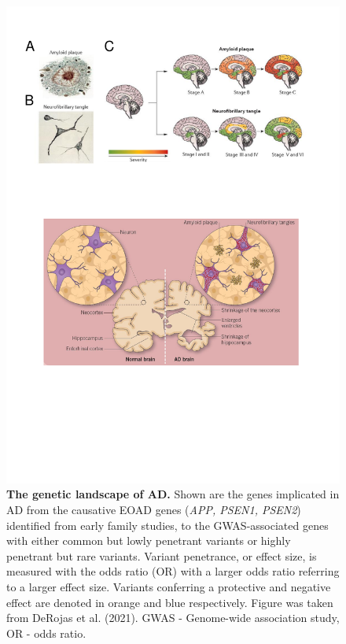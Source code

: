\begin{landscape}
	\begin{figure}[!htp]
		\centering
		\includegraphics[page=11,trim={0 17cm 0cm 1cm},clip, scale = 1.2]{Figures/Introduction_Figures.pdf}
		\captionsetup{width=1.6\textwidth,singlelinecheck=off}
		\caption[The genetic landscape of AD]%
		{\textbf{The genetic landscape of AD.} Shown are the genes implicated in AD from the causative EOAD genes (\textit{APP, PSEN1, PSEN2}) identified from early family studies, to the GWAS-associated genes with either common but lowly penetrant variants or highly penetrant but rare variants. Variant penetrance, or effect size, is measured with the odds ratio (OR) with a larger odds ratio referring to a larger effect size. Variants conferring a protective and negative effect are denoted in orange and blue respectively. Figure was taken from DeRojas et al. (2021)\cite{DeRojas2021}. GWAS - Genome-wide association study, OR - odds ratio.
		}
		\label{fig:AD_gwas}
	\end{figure}
\end{landscape}

